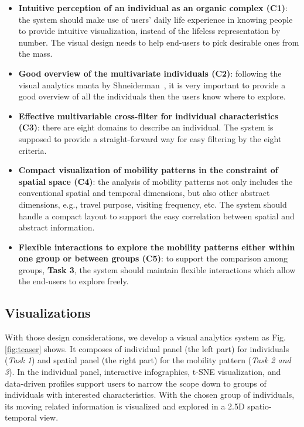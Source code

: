 \documentclass{ieeeaccess}
\begin{document}
\begin{itemize}
\item \textbf{Intuitive perception of an individual as an organic complex (C1)}: the system should make use of users' daily life experience in knowing people to provide intuitive visualization, instead of the lifeless representation by number. The visual design needs to help end-users to pick desirable ones from the mass.
\item \textbf{Good overview of the multivariate individuals (C2)}: following the visual analytics manta by Shneiderman~\cite{RN459}, it is very important to provide a good overview of all the individuals then the users know where to explore.
\item \textbf{Effective multivariable cross-filter for individual characteristics (C3)}: there are eight domains to describe an individual. The system is supposed to provide a straight-forward way for easy filtering by the eight criteria.
\item \textbf{Compact visualization of mobility patterns in the constraint of spatial space (C4)}: the analysis of mobility patterns not only includes the conventional spatial and temporal dimensions, but also other abstract dimensions, e.g., travel purpose, visiting frequency, etc. The system should handle a compact layout to support the easy correlation between spatial and abstract information.
\item \textbf{Flexible interactions to explore the mobility patterns either within one group or between groups (C5)}: to support the comparison among groups, \textbf{Task 3}, the system should maintain flexible interactions which allow the end-users to explore freely.
\end{itemize}




\subsection{Visualizations}
\label{subsec:vis}

With those design considerations, we develop a visual analytics system as Fig. \ref{fig:teaser} shows. It composes of individual panel (the left part) for individuals (\textit{Task 1}) and spatial panel (the right part) for the mobility pattern (\textit{Task 2 and 3}). In the individual panel, interactive infographics, t-SNE visualization, and data-driven profiles support users to narrow the scope down to groups of individuals with interested characteristics. With the chosen group of individuals, its moving related information is visualized and explored in a 2.5D spatio-temporal view.
\end{document}
